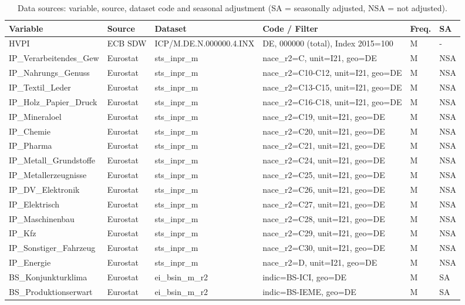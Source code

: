 \begin{table}
\caption{Data sources: variable, source, dataset code and seasonal adjustment (SA = seasonally adjusted, NSA = not adjusted).}
\label{tab:quellen}
\begin{tabular}{llllll}
\toprule
Variable & Source & Dataset & Code / Filter & Freq. & SA \\
\midrule
HVPI & ECB SDW & ICP/M.DE.N.000000.4.INX & DE, 000000 (total), Index 2015=100 & M & - \\
IP\_Verarbeitendes\_Gew & Eurostat & sts\_inpr\_m & nace\_r2=C, unit=I21, geo=DE & M & NSA \\
IP\_Nahrungs\_Genuss & Eurostat & sts\_inpr\_m & nace\_r2=C10-C12, unit=I21, geo=DE & M & NSA \\
IP\_Textil\_Leder & Eurostat & sts\_inpr\_m & nace\_r2=C13-C15, unit=I21, geo=DE & M & NSA \\
IP\_Holz\_Papier\_Druck & Eurostat & sts\_inpr\_m & nace\_r2=C16-C18, unit=I21, geo=DE & M & NSA \\
IP\_Mineraloel & Eurostat & sts\_inpr\_m & nace\_r2=C19, unit=I21, geo=DE & M & NSA \\
IP\_Chemie & Eurostat & sts\_inpr\_m & nace\_r2=C20, unit=I21, geo=DE & M & NSA \\
IP\_Pharma & Eurostat & sts\_inpr\_m & nace\_r2=C21, unit=I21, geo=DE & M & NSA \\
IP\_Metall\_Grundstoffe & Eurostat & sts\_inpr\_m & nace\_r2=C24, unit=I21, geo=DE & M & NSA \\
IP\_Metallerzeugnisse & Eurostat & sts\_inpr\_m & nace\_r2=C25, unit=I21, geo=DE & M & NSA \\
IP\_DV\_Elektronik & Eurostat & sts\_inpr\_m & nace\_r2=C26, unit=I21, geo=DE & M & NSA \\
IP\_Elektrisch & Eurostat & sts\_inpr\_m & nace\_r2=C27, unit=I21, geo=DE & M & NSA \\
IP\_Maschinenbau & Eurostat & sts\_inpr\_m & nace\_r2=C28, unit=I21, geo=DE & M & NSA \\
IP\_Kfz & Eurostat & sts\_inpr\_m & nace\_r2=C29, unit=I21, geo=DE & M & NSA \\
IP\_Sonstiger\_Fahrzeug & Eurostat & sts\_inpr\_m & nace\_r2=C30, unit=I21, geo=DE & M & NSA \\
IP\_Energie & Eurostat & sts\_inpr\_m & nace\_r2=D, unit=I21, geo=DE & M & NSA \\
BS\_Konjunkturklima & Eurostat & ei\_bsin\_m\_r2 & indic=BS-ICI, geo=DE & M & SA \\
BS\_Produktionserwart & Eurostat & ei\_bsin\_m\_r2 & indic=BS-IEME, geo=DE & M & SA \\

\end{tabular}
\end{table}
